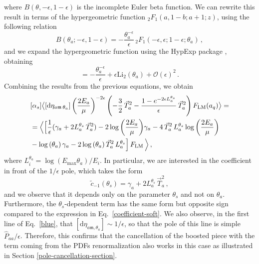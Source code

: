 \documentclass[a4paper, 12pt]{book}
\newcommand{\um}{\mathfrak{m}}
\begin{document}
where $B(\theta, -\epsilon, 1-\epsilon)$ is the incomplete Euler beta function. We can rewrite this result in terms of the hypergeometric function ${}_2F_1(a,1-b;a+1;z)$, using the following relation
\begin{equation}
  B(\theta_a; -\epsilon, 1-\epsilon) = -\frac{\theta_a^{-\epsilon}}{\epsilon} \, {}_2F_1(-\epsilon,\epsilon; 1-\epsilon;\theta_a) \, ,
\end{equation}
and we expand the hypergeometric function using the HypExp package \cite{Huber:2005yg}, obtaining
\begin{equation}
  [\mathrm{d}\eta_{a\um \, \theta_a}] = -\frac{\theta_a^{-\epsilon}}{\epsilon} + \epsilon \mathrm{Li}_2 (\theta_a)+ \mathcal{O}(\epsilon)^2 \, .
  \label{de-eta}
\end{equation}
Combining the results from the previous equations, we obtain
\begin{equation}
  \begin{aligned}
    & [\alpha_s]\bigl < [\mathrm{d}\eta_{a\um \, \theta_a}] \left(\frac{2E_a}{\mu}\right)^{-2\epsilon} \left(-\frac{3}{2} \, \vec{T}_a^2-\frac{1-e^{-2\epsilon L_a^{\theta_s}}}{\epsilon}\, \vec{T}_a^2 \right) F_{\mathrm{LM}}(a_q) \bigr> = \\
    & = \Bigl< \Bigl[ \frac{1}{\epsilon}(\gamma_a +  2 L_a^{\theta_s} \,\vec{T}_a^2) - 2 \log{\left(\frac{2E_a}{\mu}\right)}\gamma_a - 4 \, \vec{T}_a^2 \, L_a^{\theta_s} \log{\left(\frac{2E_a}{\mu}\right)} \\
    & - \log{(\theta_a)} \, \gamma_a - 2 \log{(\theta_a)} \, \vec{T}_a^2 \, L_a^{\theta_s}  \Bigr] \, F_{\mathrm{LM}} \, \Bigr > \, ,
  \end{aligned}
\end{equation}
where $L_i^{\theta_a}= \log{(E_{\mathrm{max}}\theta_a)/E_i}$. In particular, we are interested in the coefficient in front of the $1/\epsilon$ pole, which takes the form
\begin{equation}
    \tilde{c}_{-1}(\theta_s)= \gamma_a + 2 L_a^{\theta_s} \,\vec{T}_a^2 \, ,
    \label{coefficient-collinear-initial}
\end{equation}
and we observe that it depends only on the parameter $\theta_s$ and not on $\theta_a$. Furthermore, the $\theta_s$-dependent term has the same form but opposite sign compared to the expression in Eq.~\ref{coefficient-soft}. We also observe, in the first line of Eq.~\ref{blue}, that $[\mathrm{d}\eta_{a\um , \theta_a}] \sim 1/\epsilon$, so that the pole of this line is simple $\hat{P}_{aa}/ \epsilon$. Therefore, this confirms that the cancellation of the boosted piece with the term coming from the PDFs renormalization also works in this case as illustrated in Section \ref{pole-cancellation-section}.
\end{document}
